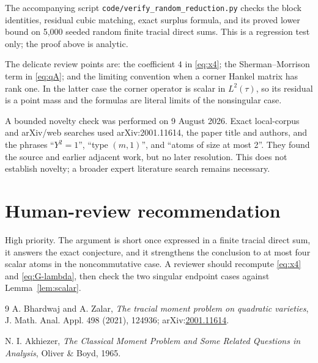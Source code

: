 \documentclass[11pt]{article}
\begin{document}
The accompanying script \texttt{code/verify\_random\_reduction.py} checks the
block identities, residual cubic matching, exact surplus formula, and its
proved lower bound on 5,000 seeded random finite tracial direct sums.  This is
a regression test only; the proof above is analytic.

The delicate review points are: the coefficient $4$ in \eqref{eq:x4}; the
Sherman--Morrison term in \eqref{eq:qA}; and the limiting convention when a
corner Hankel matrix has rank one.  In the latter case the corner operator is
scalar in $L^2(\tau)$, so its residual is a point mass and the formulas are
literal limits of the nonsingular case.

A bounded novelty check was performed on 9 August 2026.  Exact local-corpus
and arXiv/web searches used arXiv:2001.11614, the paper title and authors, and
the phrases ``$Y^2=1$'', ``type $(m,1)$'', and ``atoms of size at most 2''.
They found the source and earlier adjacent work, but no later resolution.
This does not establish novelty; a broader expert literature search remains
necessary.

\section{Human-review recommendation}

High priority.  The argument is short once expressed in a finite tracial
direct sum, it answers the exact conjecture, and it strengthens the conclusion
to at most four scalar atoms in the noncommutative case.  A reviewer should
recompute \eqref{eq:x4} and \eqref{eq:G-lambda}, then check the two singular
endpoint cases against Lemma~\ref{lem:scalar}.

\begin{thebibliography}{9}
A. Bhardwaj and A. Zalar,
\emph{The tracial moment problem on quadratic varieties},
J. Math. Anal. Appl. 498 (2021), 124936;
arXiv:\href{https://arxiv.org/abs/2001.11614}{2001.11614}.

N. I. Akhiezer,
\emph{The Classical Moment Problem and Some Related Questions in Analysis},
Oliver \& Boyd, 1965.
\end{thebibliography}
\end{document}
